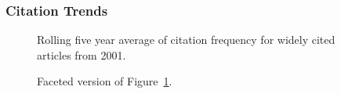 \documentclass[
  10pt,
  letterpaper,
  DIV=11,
  numbers=noendperiod,
  twoside]{scrartcl}
\begin{document}
\subsubsection*{Citation Trends}\label{citation-trends-25}

\begin{figure}


\caption{\label{fig-citation-spaghetti-2001}Rolling five year average of
citation frequency for widely cited articles from 2001.}

\end{figure}%

\begin{figure}


\caption{\label{fig-citation-facet-2001}Faceted version of
Figure~\ref{fig-citation-spaghetti-2001}.}

\end{figure}%
\end{document}
